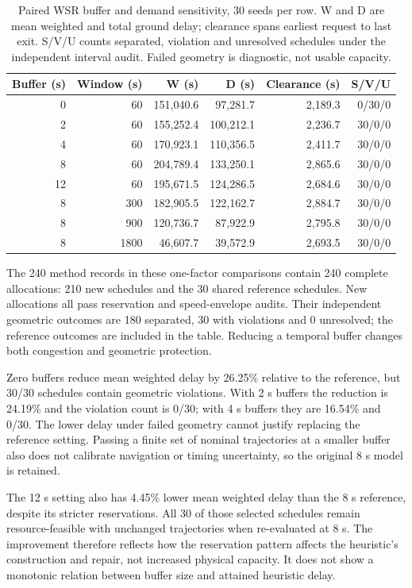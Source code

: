 \begin{table}[!htbp]
\centering\small
\caption{Paired WSR buffer and demand sensitivity, 30 seeds per row. W and D are mean weighted and total ground delay; clearance spans earliest request to last exit. S/V/U counts separated, violation and unresolved schedules under the independent interval audit. Failed geometry is diagnostic, not usable capacity.}\label{tab:capacity-sensitivity}
\begin{tabular}{rrrrrr}
\toprule
Buffer (s) & Window (s) & W (s) & D (s) & Clearance (s) & S/V/U\\
\midrule
0 & 60 & 151,040.6 & 97,281.7 & 2,189.3 & 0/30/0\\
2 & 60 & 155,252.4 & 100,212.1 & 2,236.7 & 30/0/0\\
4 & 60 & 170,923.1 & 110,356.5 & 2,411.7 & 30/0/0\\
8 & 60 & 204,789.4 & 133,250.1 & 2,865.6 & 30/0/0\\
12 & 60 & 195,671.5 & 124,286.5 & 2,684.6 & 30/0/0\\
8 & 300 & 182,905.5 & 122,162.7 & 2,884.7 & 30/0/0\\
8 & 900 & 120,736.7 & 87,922.9 & 2,795.8 & 30/0/0\\
8 & 1800 & 46,607.7 & 39,572.9 & 2,693.5 & 30/0/0\\
\bottomrule
\end{tabular}
\end{table}

The 240 method records in these one-factor comparisons contain 240 complete allocations: 210 new schedules and the 30 shared reference schedules. New allocations all pass reservation and speed-envelope audits. Their independent geometric outcomes are 180 separated, 30 with violations and 0 unresolved; the reference outcomes are included in the table. Reducing a temporal buffer changes both congestion and geometric protection.

Zero buffers reduce mean weighted delay by 26.25\% relative to the reference, but 30/30 schedules contain geometric violations. With 2 s buffers the reduction is 24.19\% and the violation count is 0/30; with 4 s buffers they are 16.54\% and 0/30. The lower delay under failed geometry cannot justify replacing the reference setting. Passing a finite set of nominal trajectories at a smaller buffer also does not calibrate navigation or timing uncertainty, so the original 8 s model is retained.

The 12 s setting also has 4.45\% lower mean weighted delay than the 8 s reference, despite its stricter reservations. All 30 of those selected schedules remain resource-feasible with unchanged trajectories when re-evaluated at 8 s. The improvement therefore reflects how the reservation pattern affects the heuristic's construction and repair, not increased physical capacity. It does not show a monotonic relation between buffer size and attained heuristic delay.

